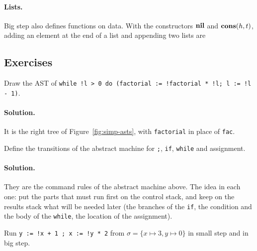 \paragraph{Lists.} Big step also defines functions on data. With the
constructors $\mathbf{nil}$ and $\mathbf{cons}(h,t)$, adding an element at the end of a list
and appending two lists are

\subsection{Exercises}

\begin{exercise}
Draw the AST of \texttt{while !l > 0 do (factorial := !factorial * !l; l := !l - 1)}.
\end{exercise}

\paragraph{Solution.} It is the right tree of Figure~\ref{fig:simp-asts}, with
\texttt{factorial} in place of \texttt{fac}.

\begin{exercise}
Define the transitions of the abstract machine for \texttt{;}, \texttt{if},
\texttt{while} and assignment.
\end{exercise}

\paragraph{Solution.} They are the command rules of the abstract machine above.
The idea in each one: put the parts that must run first on the control stack,
and keep on the results stack what will be needed later (the branches of the
\texttt{if}, the condition and the body of the \texttt{while}, the location of
the assignment).

\begin{exercise}
Run \texttt{y := !x + 1 ; x := !y * 2} from $\sigma = \{x \mapsto 3, y \mapsto 0\}$ in small
step and in big step.
\end{exercise}

